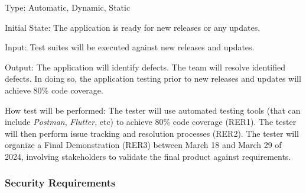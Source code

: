 \documentclass[12pt, titlepage]{article}
\begin{document}
\begin{enumerate}
Type: Automatic, Dynamic, Static

Initial State: The application is ready for new releases or any updates.
                
Input: Test suites will be executed against new releases and updates.
                
Output: The application will identify defects. The team will resolve identified defects. In doing so, the application testing prior to new releases and updates will achieve 80\% code coverage.
                
How test will be performed: The tester will use automated testing tools (that can include \textit{Postman}, \textit{Flutter}, etc) to achieve 80\% code coverage (RER1). The tester will then perform issue tracking and resolution processes (RER2). The tester will organize a Final Demonstration (RER3) between March 18 and March 29 of 2024, involving stakeholders to validate the final product against requirements.

\end{enumerate}

\subsubsection{Security Requirements}
\end{document}
